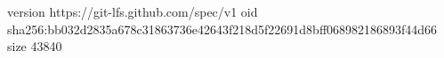 version https://git-lfs.github.com/spec/v1
oid sha256:bb032d2835a678c31863736e42643f218d5f22691d8bff068982186893f44d66
size 43840
